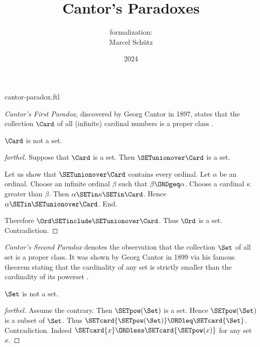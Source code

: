 \documentclass{article}
\title{Cantor's Paradoxes}
\author{\Naproche formalization: \\[0.5em]Marcel Schütz}
\date{2024}
\begin{document}
\begin{smodule}{cantor-paradox.ftl}
\maketitle


\noindent \emph{Cantor's First Paradox}, discovered by Georg Cantor in 1897,
states that the collection $\Card$ of all (infinite) cardinal numbers is a
proper class \cite[chapter 156]{Cantor1991}.

\begin{theorem}[forthel,title=Cantor's First Paradox,id=cantor_paradox_1]
  $\Card$ is not a set.
\end{theorem}
\begin{proof}[forthel]
  Suppose that $\Card$ is a set.
  Then $\SETunionover \Card$ is a set.

  Let us show that $\SETunionover \Card$ contains every ordinal.
    Let $\alpha$ be an ordinal.
    Choose an infinite ordinal $\beta$ such that $\beta \ORDgeq \alpha$.
    Choose a cardinal $\kappa$ greater than $\beta$.
    Then $\alpha \SETin \kappa \SETin \Card$.
    Hence $\alpha \SETin \SETunionover \Card$.
  End.

  Therefore $\Ord \SETinclude \SETunionover \Card$.
  Thus $\Ord$ is a set.
  Contradiction.
\end{proof}

\emph{Cantor's Second Paradox} denotes the observation that the collection
$\Set$ of all set is a proper class.
It was shown by Georg Cantor in 1899 via his famous theorem stating that the
cardinality of any set is strictly smaller than the cardinality of its 
powerset \cite[chapter 163]{Cantor1991}.

\begin{theorem}[forthel,title=Cantor's Second Paradox,id=cantor_paradox_2]
  $\Set$ is not a set.
\end{theorem}
\begin{proof}[forthel]
  Assume the contrary.
  Then $\SETpow(\Set)$ is a set.
  Hence $\SETpow(\Set)$ is a subset of $\Set$.
  Thus $\SETcard{\SETpow(\Set)} \ORDleq \SETcard{\Set}$.
  Contradiction.
  Indeed $\SETcard{x} \ORDless \SETcard{\SETpow(x)}$ for any set $x$.
\end{proof}

\printbibliography
{}
\end{smodule}
\end{document}
